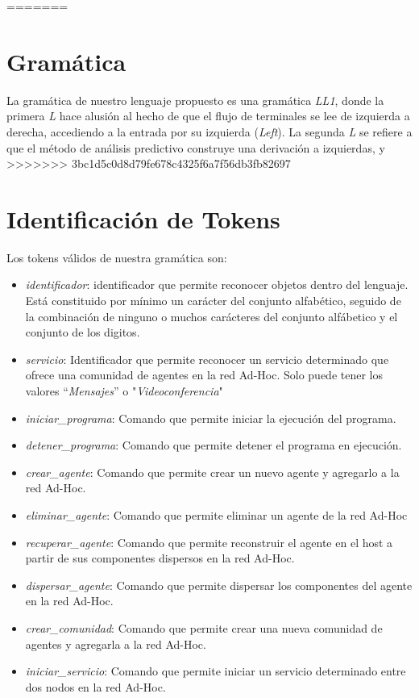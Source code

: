 \documentclass{article}
\begin{document}
=======
\section{Gramática}
La gramática de nuestro lenguaje propuesto es una gramática \textit{LL1}, donde la primera \textit{L} hace alusión al hecho de que el flujo de terminales se lee de izquierda a derecha, accediendo a la entrada por su izquierda (\textit{Left}). La segunda \textit{L} se refiere a que el método de análisis predictivo construye una derivación a izquierdas, y 
>>>>>>> 3bc1d5c0d8d79fe678c4325f6a7f56db3fb82697
\section{Identificación de Tokens}
Los tokens válidos de nuestra gramática son:
\begin{itemize}
\item \textit{identificador}: identificador que permite reconocer objetos dentro del lenguaje. Está constituido por mínimo un carácter del conjunto alfabético, seguido de la combinación de ninguno o muchos carácteres del conjunto alfábetico y el conjunto de los digitos.
\item \textit{servicio}: Identificador que permite reconocer un servicio determinado que ofrece una comunidad de agentes en la red Ad-Hoc. Solo puede tener los valores ``\textit{Mensajes}'' o "\textit{Videoconferencia}"
\item \textit{iniciar\_programa}: Comando que permite iniciar la ejecución del programa.
\item \textit{detener\_programa}: Comando que permite detener el programa en ejecución.
\item \textit{crear\_agente}: Comando que permite crear un nuevo agente y agregarlo a la red Ad-Hoc.
\item \textit{eliminar\_agente}: Comando que permite eliminar un agente de la red Ad-Hoc
\item \textit{recuperar\_agente}: Comando que permite reconstruir el agente en el host a partir de sus componentes dispersos en la red Ad-Hoc.
\item \textit{dispersar\_agente}: Comando que permite dispersar los componentes del agente en la red Ad-Hoc.
\item \textit{crear\_comunidad}: Comando que permite crear una nueva comunidad de agentes y agregarla a la red Ad-Hoc.
\item \textit{iniciar\_servicio}: Comando que permite iniciar un servicio determinado entre dos nodos en la red Ad-Hoc.

\end{itemize}
\end{document}
